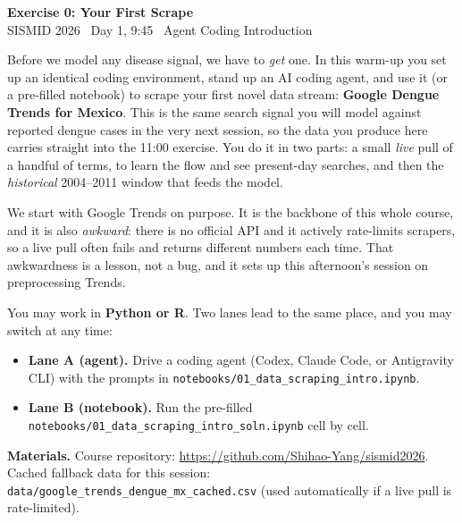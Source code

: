 \documentclass[11pt]{article}
\begin{document}
\begin{center}
  {\Large\bfseries Exercise 0: Your First Scrape}\\[2pt]
  {\normalsize SISMID 2026 \textbullet\ Day 1, 9:45 \textbullet\ Agent Coding Introduction}
\end{center}

\medskip

Before we model any disease signal, we have to \emph{get} one. In this warm-up you set
up an identical coding environment, stand up an AI coding agent, and use it (or a
pre-filled notebook) to scrape your first novel data stream: \textbf{Google Dengue
Trends for Mexico}. This is the same search signal you will model against reported
dengue cases in the very next session, so the data you produce here carries straight
into the 11:00 exercise. You do it in two parts: a small \emph{live} pull of a handful
of terms, to learn the flow and see present-day searches, and then the \emph{historical}
2004--2011 window that feeds the model.

We start with Google Trends on purpose. It is the backbone of this whole course, and it
is also \emph{awkward}: there is no official API and it actively rate-limits scrapers,
so a live pull often fails and returns different numbers each time. That awkwardness is
a lesson, not a bug, and it sets up this afternoon's session on preprocessing Trends.

You may work in \textbf{Python or R}. Two lanes lead to the same place, and you may
switch at any time:
\begin{itemize}[nosep]
  \item \textbf{Lane A (agent).} Drive a coding agent (Codex, Claude Code, or Antigravity
        CLI) with the prompts in \texttt{notebooks/01\_data\_scraping\_intro.ipynb}.
  \item \textbf{Lane B (notebook).} Run the pre-filled
        \texttt{notebooks/01\_data\_scraping\_intro\_soln.ipynb} cell by cell.
\end{itemize}

\textbf{Materials.} Course repository:
\url{https://github.com/Shihao-Yang/sismid2026}. Cached fallback data for this session:
\texttt{data/google\_trends\_dengue\_mx\_cached.csv} (used automatically if a live pull
is rate-limited).
\end{document}
